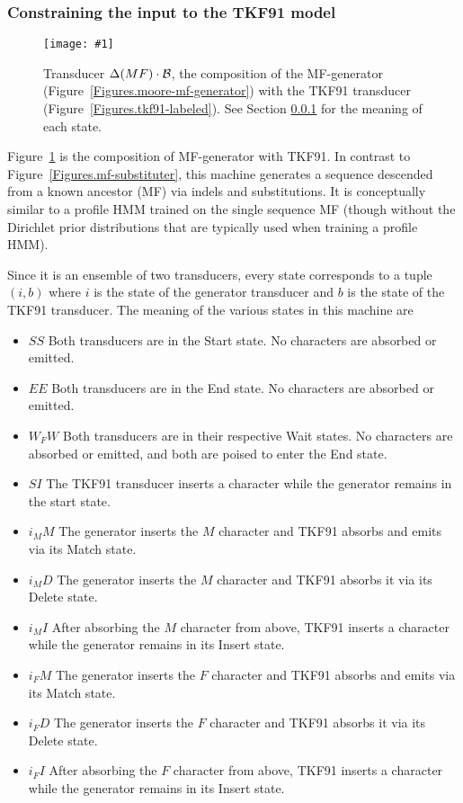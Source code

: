 \documentclass{article}
\newcommand{\figref}[1]{Figure~\ref{Figures.#1}}
\newcommand{\figlabel}[1]{\label{Figures.#1}}
\newcommand{\easyfig}[4]{
\begin{figure}
\texttt{[image: \#1]}
\caption{ \figlabel{#3} #4}
\end{figure}}
\newcommand{\tallpdffig}[2]{\easyfig{#1-fig.pdf}{height=\textheight}{#1}{#2}}
\newcommand\tkf{{\cal B}}
\newcommand\generate{\Delta}
\begin{document}
\subsubsection{Constraining the input to the TKF91 model}
\label{mf-tkf91}
\tallpdffig{mf-tkf91}{Transducer $\generate(MF) \cdot \tkf$, the composition of the MF-generator (\figref{moore-mf-generator}) with the TKF91 transducer (\figref{tkf91-labeled}).  See Section \ref{mf-tkf91} for the meaning of each state. }

\figref{mf-tkf91} is the composition of MF-generator with TKF91.  
In contrast to \figref{mf-substituter}, this machine generates
a sequence descended from a known ancestor (MF) via indels and substitutions.  It is conceptually similar to a profile HMM
trained on the single sequence MF (though without the Dirichlet prior distributions that are typically used when training a profile HMM).

Since it is an ensemble of two transducers, every state corresponds to a tuple $(i,b)$
where
$i$ is the state of the generator transducer and
$b$ is the state of the TKF91 transducer.
The meaning of the various states in this machine are
\begin{itemize}
\item $SS$ Both transducers are in the Start state.  No characters are  absorbed or emitted.
\item $EE$ Both transducers are in the End state.  No characters are  absorbed or emitted.
\item $W_FW$ Both transducers are in their respective Wait states.  No characters are absorbed or emitted, and both are poised to enter the End state. 
\item $SI$ The TKF91 transducer inserts a character while the generator remains in the start state. 
\item $i_MM$ The  generator inserts the $M$ character and TKF91 absorbs and emits via its Match state.
\item $i_MD$ The  generator inserts the $M$ character and TKF91 absorbs it via its Delete state.
\item $i_MI$ After absorbing the $M$ character from above, TKF91 inserts a character while the generator remains in its Insert state. 
\item $i_FM$ The  generator inserts the $F$ character and TKF91 absorbs and emits via its Match state.
\item $i_FD$ The  generator inserts the $F$ character and TKF91 absorbs it via its Delete state.
\item $i_FI$ After absorbing the $F$ character from above, TKF91 inserts a character while the generator remains in its Insert state. 
\end{itemize}
\end{document}
